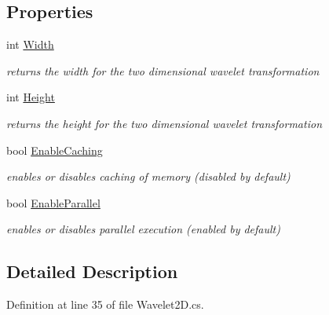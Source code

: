 \subsection*{Properties}
\begin{DoxyCompactItemize}
\item 
int \hyperlink{class_turbo_wavelets_1_1_wavelet2_d_a30058c5e0e5bd95b29bc080efbcf9083}{Width}
\begin{DoxyCompactList}\small\item\em returns the width for the two dimensional wavelet transformation \end{DoxyCompactList}\item 
int \hyperlink{class_turbo_wavelets_1_1_wavelet2_d_a277d0f89d73f839350c64a83ccd76ff6}{Height}
\begin{DoxyCompactList}\small\item\em returns the height for the two dimensional wavelet transformation \end{DoxyCompactList}\item 
bool \hyperlink{class_turbo_wavelets_1_1_wavelet2_d_abbd41e51d24f8a7912ae47dd364ed4fb}{Enable\+Caching}
\begin{DoxyCompactList}\small\item\em enables or disables caching of memory (disabled by default) \end{DoxyCompactList}\item 
bool \hyperlink{class_turbo_wavelets_1_1_wavelet2_d_abec21e54c6ab8cce0e02ef3ad64ae5af}{Enable\+Parallel}
\begin{DoxyCompactList}\small\item\em enables or disables parallel execution (enabled by default) \end{DoxyCompactList}\end{DoxyCompactItemize}


\subsection{Detailed Description}


Definition at line 35 of file Wavelet2\+D.\+cs.



